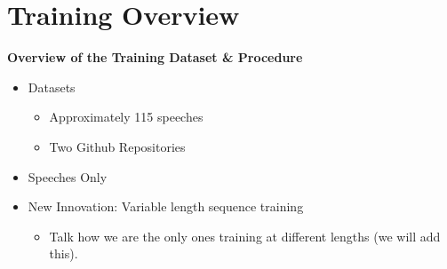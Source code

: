 \documentclass[10pt,aspectratio=169]{beamer}
\begin{document}
  \section{Training Overview}
  \begin{frame}{\textbf{Overview of the Training Dataset \& Procedure}}

  \begin{itemize}
    \item Datasets
    \begin{itemize}
      \item Approximately 115 speeches
      \item Two Github Repositories
    \end{itemize}
  
    \item Speeches Only
  
    \item New Innovation: Variable length sequence training
    \begin{itemize}
      \item Talk how we are the only ones training at different lengths (we will add this).
    \end{itemize}
  \end{itemize}

  
  \end{frame}
  
  
\end{document}
